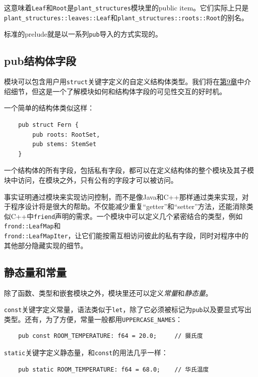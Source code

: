 这意味着\texttt{Leaf}和\texttt{Root}是\texttt{plant\_structures}模块里的public item。它们实际上只是\\
\texttt{plant\_structures::leaves::Leaf}和\texttt{plant\_structures::roots::Root}的别名。

标准的prelude就是以一系列\texttt{pub}导入的方式实现的。

\subsection{pub结构体字段}
模块可以包含用户用\texttt{struct}关键字定义的自定义结构体类型。我们将在\hyperref[ch09]{第9章}中介绍细节，但这是一个了解模块如何和结构体字段的可见性交互的好时机。

一个简单的结构体类似这样：
\begin{verbatim}
    pub struct Fern {
        pub roots: RootSet,
        pub stems: StemSet
    }
\end{verbatim}

一个结构体的所有字段，包括私有字段，都可以在定义结构体的整个模块及其子模块中访问，在模块之外，只有公有的字段才可以被访问。

事实证明通过模块来实现访问控制，而不是像Java和C++那样通过类来实现，对于程序设计将是很大的帮助。不仅能减少重复“getter”和“setter”方法，还能消除类似C++中\texttt{friend}声明的需求。一个模块中可以定义几个紧密结合的类型，例如\texttt{frond::LeafMap}和\\
\texttt{frond::LeafMapIter}，让它们能按需互相访问彼此的私有字段，同时对程序中的其他部分隐藏实现的细节。

\subsection{静态量和常量}\label{static}

除了函数、类型和嵌套模块之外，模块里还可以定义\emph{常量}和\emph{静态量}。

\texttt{const}关键字定义常量，语法类似于\texttt{let}，除了它必须被标记为\texttt{pub}以及要显式写出类型。还有，为了方便，常量一般都用\texttt{UPPERCASE\_NAMES}：
\begin{verbatim}
    pub const ROOM_TEMPERATURE: f64 = 20.0;     // 摄氏度
\end{verbatim}

\texttt{static}关键字定义静态量，和\texttt{const}的用法几乎一样：
\begin{verbatim}
    pub static ROOM_TEMPERATURE: f64 = 68.0;    // 华氏温度
\end{verbatim}


